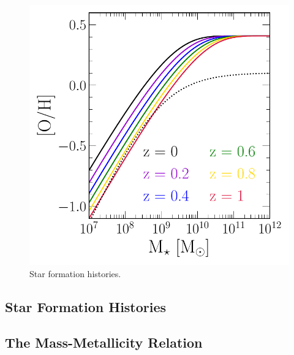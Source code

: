 \documentclass[ms.tex]{subfiles}
\begin{document}
\begin{figure}
\includegraphics[scale = 0.42]{mzr.pdf}
\caption{Star formation histories.}
\label{fig:sfhs}
\end{figure}

\subsection{Star Formation Histories}
\label{sec:galprops:sfhs}

\subsection{The Mass-Metallicity Relation}
\label{sec:galprops:mzr}
\end{document}

